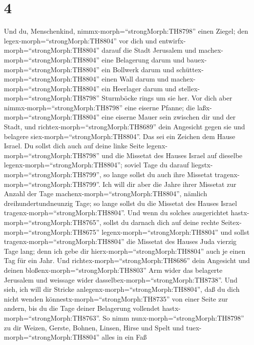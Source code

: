 \hypertarget{section-3}{%
\section{4}\label{section-3}}

 Und du, Menschenkind, nimmx-morph=``strongMorph:TH8798''
einen Ziegel; den legex-morph=``strongMorph:TH8804'' vor dich und
entwirfx-morph=``strongMorph:TH8804'' darauf die Stadt Jerusalem
 und machex-morph=``strongMorph:TH8804'' eine Belagerung
darum und bauex-morph=``strongMorph:TH8804'' ein Bollwerk darum und
schüttex-morph=``strongMorph:TH8804'' einen Wall darum und
machex-morph=``strongMorph:TH8804'' ein Heerlager darum und
stellex-morph=``strongMorph:TH8798'' Sturmböcke rings um sie her.
 Vor dich aber nimmx-morph=``strongMorph:TH8798'' eine
eiserne Pfanne; die laßx-morph=``strongMorph:TH8804'' eine eiserne Mauer
sein zwischen dir und der Stadt, und
richtex-morph=``strongMorph:TH8689'' dein Angesicht gegen sie und
belagere siex-morph=``strongMorph:TH8804''. Das sei ein Zeichen dem
Hause Israel.  Du sollst dich auch auf deine linke Seite
legenx-morph=``strongMorph:TH8798'' und die Missetat des Hauses Israel
auf dieselbe legenx-morph=``strongMorph:TH8804''; soviel Tage du darauf
liegstx-morph=``strongMorph:TH8799'', so lange sollst du auch ihre
Missetat tragenx-morph=``strongMorph:TH8799''.  Ich will dir
aber die Jahre ihrer Missetat zur Anzahl der Tage
machenx-morph=``strongMorph:TH8804'', nämlich dreihundertundneunzig
Tage; so lange sollst du die Missetat des Hauses Israel
tragenx-morph=``strongMorph:TH8804''.  Und wenn du solches
ausgerichtet hastx-morph=``strongMorph:TH8765'', sollst du darnach dich
auf deine rechte Seitex-morph=``strongMorph:TH8675''
legenx-morph=``strongMorph:TH8804'' und sollst
tragenx-morph=``strongMorph:TH8804'' die Missetat des Hauses Juda
vierzig Tage lang; denn ich gebe dir hierx-morph=``strongMorph:TH8804''
auch je einen Tag für ein Jahr.  Und
richtex-morph=``strongMorph:TH8686'' dein Angesicht und deinen
bloßenx-morph=``strongMorph:TH8803'' Arm wider das belagerte Jerusalem
und weissage wider dasselbex-morph=``strongMorph:TH8738''. 
Und sieh, ich will dir Stricke anlegenx-morph=``strongMorph:TH8804'',
daß du dich nicht wenden könnestx-morph=``strongMorph:TH8735'' von einer
Seite zur andern, bis du die Tage deiner Belagerung vollendet
hastx-morph=``strongMorph:TH8763''.  So nimm
nunx-morph=``strongMorph:TH8798'' zu dir Weizen, Gerste, Bohnen, Linsen,
Hirse und Spelt und tuex-morph=``strongMorph:TH8804'' alles in ein Faß
